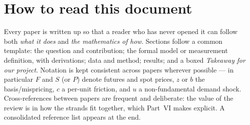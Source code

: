 \documentclass[11pt,a4paper]{article}
\newcommand{\1}{\mathbf{1}}
\begin{document}
\newpage
\tableofcontents
\newpage

\section*{How to read this document}
Every paper is written up so that a reader who has never opened it can follow both \emph{what it does} and \emph{the mathematics of how}. Sections follow a common template: the question and contribution; the formal model or measurement definition, with derivations; data and method; results; and a boxed \textit{Takeaway for our project}. Notation is kept consistent across papers wherever possible --- in particular $F$ and $S$ (or $P$) denote futures and spot prices, $z$ or $b$ the basis/mispricing, $c$ a per-unit friction, and $u$ a non-fundamental demand shock. Cross-references between papers are frequent and deliberate: the value of the review is in how the strands fit together, which Part~VI makes explicit. A consolidated reference list appears at the end.









\end{document}
